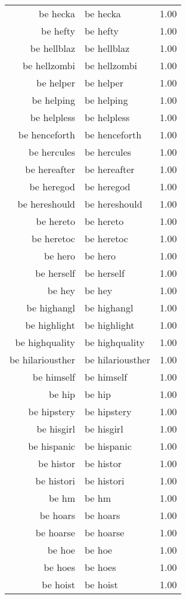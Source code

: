 \begin{table}[ht]
\begin{tabular}{rlr}
  be hecka & be hecka & 1.00 \\ 
  be hefty & be hefty & 1.00 \\ 
  be hellblaz & be hellblaz & 1.00 \\ 
  be hellzombi & be hellzombi & 1.00 \\ 
  be helper & be helper & 1.00 \\ 
  be helping & be helping & 1.00 \\ 
  be helpless & be helpless & 1.00 \\ 
  be henceforth & be henceforth & 1.00 \\ 
  be hercules & be hercules & 1.00 \\ 
  be hereafter & be hereafter & 1.00 \\ 
  be heregod & be heregod & 1.00 \\ 
  be hereshould & be hereshould & 1.00 \\ 
  be hereto & be hereto & 1.00 \\ 
  be heretoc & be heretoc & 1.00 \\ 
  be hero & be hero & 1.00 \\ 
  be herself & be herself & 1.00 \\ 
  be hey & be hey & 1.00 \\ 
  be highangl & be highangl & 1.00 \\ 
  be highlight & be highlight & 1.00 \\ 
  be highquality & be highquality & 1.00 \\ 
  be hilariousther & be hilariousther & 1.00 \\ 
  be himself & be himself & 1.00 \\ 
  be hip & be hip & 1.00 \\ 
  be hipstery & be hipstery & 1.00 \\ 
  be hisgirl & be hisgirl & 1.00 \\ 
  be hispanic & be hispanic & 1.00 \\ 
  be histor & be histor & 1.00 \\ 
  be histori & be histori & 1.00 \\ 
  be hm & be hm & 1.00 \\ 
  be hoars & be hoars & 1.00 \\ 
  be hoarse & be hoarse & 1.00 \\ 
  be hoe & be hoe & 1.00 \\ 
  be hoes & be hoes & 1.00 \\ 
  be hoist & be hoist & 1.00 \\ 

\end{tabular}
\end{table}
